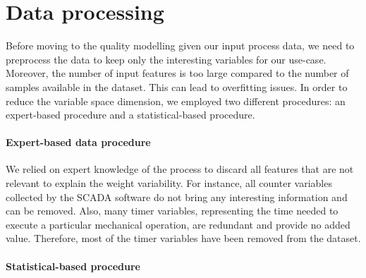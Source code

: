 \section{Data processing}

Before moving to the quality modelling given our input process data, we need to preprocess the data to keep only the interesting variables for our use-case. Moreover, the number of input features is too large compared to the number of samples available in the dataset. This can lead to overfitting issues. In order to reduce the variable space dimension, we employed two different procedures: an expert-based procedure and a statistical-based procedure.

\paragraph{Expert-based data procedure}

We relied on expert knowledge of the process to discard all features that are not relevant to explain the weight variability. For instance, all counter variables collected by the SCADA software do not bring any interesting information and can be removed. Also, many timer variables, representing the time needed to execute a particular mechanical operation, are redundant and provide no added value. Therefore, most of the timer variables have been removed from the dataset.

\paragraph{Statistical-based procedure}

